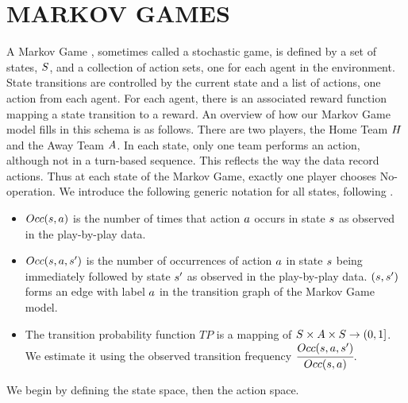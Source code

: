 \section{MARKOV GAMES}
A Markov Game \citep{Littman1994}, sometimes called a stochastic game, is defined by a set of states, $S$, and a collection of action sets, one for each agent in the environment. State transitions are controlled by the current state and a list of actions, one action from each agent. For each agent, there is an associated reward function mapping a state transition to a reward. An overview of how our Markov Game model fills in this schema is as follows. There are two players, the Home Team $H$ and the Away Team $A$.
In each state, only one team performs an action, although not in a turn-based sequence.
This reflects the way the data record actions.
Thus at each state of the Markov Game, exactly one player chooses No-operation.
We introduce the following generic notation for all states, following \citep{Russell2010,Littman1994}.

\begin{itemize}
\item $Occ(s,a)$ is the number of times that action $a$ occurs in state $s$ as observed in the play-by-play data.
\item $Occ(s,a,s')$ is the number of occurrences of action $a$ in state $s$ being immediately followed by state $s'$ as observed in the play-by-play data. $(s,s')$ forms an edge with label $a$ in the transition graph of the Markov Game model.
\item The transition probability function $TP$ is a mapping of $S \times A \times S \rightarrow (0,1]$. We estimate it using the observed transition frequency $\cfrac{Occ(s,a,s')}{Occ(s,a)}$.
\end{itemize}

We begin by defining the state space, then the action space.


